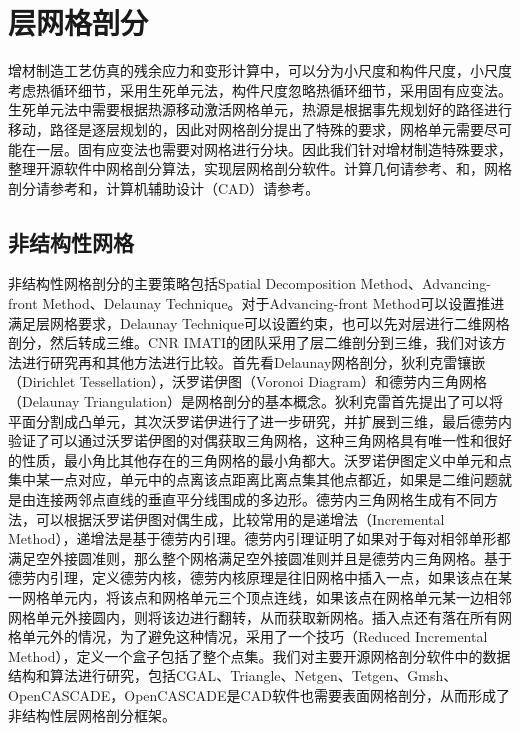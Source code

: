 \chapter{层网格剖分}

增材制造工艺仿真的残余应力和变形计算中，可以分为小尺度和构件尺度，小尺度考虑热循环细节，采用生死单元法，构件尺度忽略热循环细节，采用固有应变法。生死单元法中需要根据热源移动激活网格单元，热源是根据事先规划好的路径进行移动，路径是逐层规划的，因此对网格剖分提出了特殊的要求，网格单元需要尽可能在一层。固有应变法也需要对网格进行分块。因此我们针对增材制造特殊要求，整理开源软件中网格剖分算法，实现层网格剖分软件。计算几何请参考\cite{JeanMarietteHerve}、\cite{JakobJensFrançoisHenrik}和\cite{MarkMarcMarkOtfried}，网格剖分请参考\cite{PascalPaul}和\cite{PaulHouman}，计算机辅助设计（CAD）请参考\cite{Erich}。

\section{非结构性网格}

非结构性网格剖分的主要策略包括Spatial Decomposition Method、Advancing-front Method、Delaunay Technique。对于Advancing-front Method可以设置推进满足层网格要求，Delaunay Technique可以设置约束，也可以先对层进行二维网格剖分，然后转成三维。CNR IMATI的团队采用了层二维剖分到三维，我们对该方法进行研究再和其他方法进行比较。首先看Delaunay网格剖分，狄利克雷镶嵌（Dirichlet Tessellation），沃罗诺伊图（Voronoi Diagram）和德劳内三角网格（Delaunay Triangulation）是网格剖分的基本概念。狄利克雷首先提出了可以将平面分割成凸单元，其次沃罗诺伊进行了进一步研究，并扩展到三维，最后德劳内验证了可以通过沃罗诺伊图的对偶获取三角网格，这种三角网格具有唯一性和很好的性质，最小角比其他存在的三角网格的最小角都大。沃罗诺伊图定义中单元和点集中某一点对应，单元中的点离该点距离比离点集其他点都近，如果是二维问题就是由连接两邻点直线的垂直平分线围成的多边形。德劳内三角网格生成有不同方法，可以根据沃罗诺伊图对偶生成，比较常用的是递增法（Incremental Method），递增法是基于德劳内引理。德劳内引理证明了如果对于每对相邻单形都满足空外接圆准则，那么整个网格满足空外接圆准则并且是德劳内三角网格。基于德劳内引理，定义德劳内核，德劳内核原理是往旧网格中插入一点，如果该点在某一网格单元内，将该点和网格单元三个顶点连线，如果该点在网格单元某一边相邻网格单元外接圆内，则将该边进行翻转，从而获取新网格。插入点还有落在所有网格单元外的情况，为了避免这种情况，采用了一个技巧（Reduced Incremental Method），定义一个盒子包括了整个点集。我们对主要开源网格剖分软件中的数据结构和算法进行研究，包括CGAL、Triangle、Netgen、Tetgen、Gmsh、OpenCASCADE，OpenCASCADE是CAD软件也需要表面网格剖分，从而形成了非结构性层网格剖分框架。

